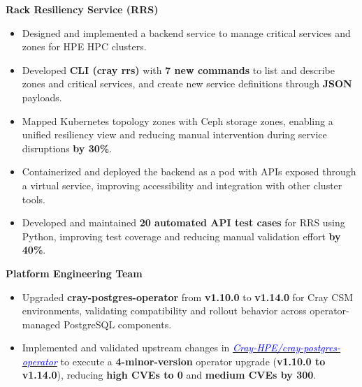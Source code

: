 \documentclass[a4paper,11pt]{article}
\begin{document}
            \item [\textbullet] \textbf{Rack Resiliency Service (RRS)}
            \begin{itemize}[leftmargin=5mm, rightmargin=2ex, noitemsep, labelsep=1.2mm, itemsep=0mm]
              \item [\textopenbullet] Designed and implemented a backend service to manage critical services and zones for HPE HPC clusters.
              \item [\textopenbullet] Developed \textbf{CLI (cray rrs)} with \textbf{7 new commands} to list and describe zones and critical services, and create new service definitions through \textbf{JSON} payloads.
              \item [\textopenbullet] Mapped Kubernetes topology zones with Ceph storage zones, enabling a unified resiliency view and reducing manual intervention during service disruptions \textbf{by 30\%}.
              \item [\textopenbullet] Containerized and deployed the backend as a pod with APIs exposed through a virtual service, improving accessibility and integration with other cluster tools.
              \item [\textopenbullet] Developed and maintained \textbf{20 automated API test cases} for RRS using Python, improving test coverage and reducing manual validation effort \textbf{by 40\%}.
            \end{itemize}
            \item [\textbullet] \textbf{Platform Engineering Team}
            \begin{itemize}[leftmargin=5mm, rightmargin=2ex, noitemsep, labelsep=1.2mm, itemsep=0mm]
              \item [\textopenbullet] Upgraded \textbf{cray-postgres-operator} from \textbf{v1.10.0} to \textbf{v1.14.0} for Cray CSM environments, validating compatibility and rollout behavior across operator-managed PostgreSQL components.
              \item [\textopenbullet] Implemented and validated upstream changes in \href{https://github.com/Cray-HPE/cray-postgres-operator/}{\textit{\textcolor{blue}{Cray-HPE/cray-postgres-operator}}} to execute a \textbf{4-minor-version} operator upgrade (\textbf{v1.10.0 to v1.14.0}), reducing \textbf{high CVEs to 0} and \textbf{medium CVEs by 300}.
            \end{itemize}
\end{document}
